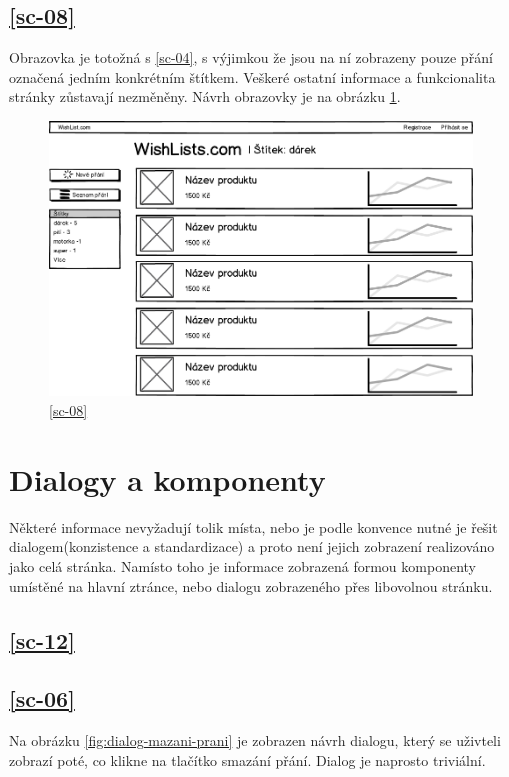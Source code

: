 \subsection{\ref{sc-08}}
\label{sec:prani-podle-stitku}
Obrazovka je totožná s \ref{sc-04}, s výjimkou že jsou na ní zobrazeny pouze přání označená jedním konkrétním štítkem. Veškeré ostatní informace a funkcionalita stránky zůstavají nezměněny. Návrh obrazovky je na obrázku \ref{fig:prani-oznacena-tagem}.

\begin{figure}[htb]
\begin{center}
\includegraphics[width=130mm]{./pictures/mock/prani-oznacena-tagem.png}
\caption{\ref{sc-08}}
\label{fig:prani-oznacena-tagem}
\end{center}
\end{figure}

\section{Dialogy a komponenty}
Některé informace nevyžadují tolik místa, nebo je podle konvence nutné je řešit dialogem(konzistence a standardizace\cite{molich1990improving}) a proto není jejich zobrazení realizováno jako celá stránka. Namísto toho je informace zobrazená formou komponenty umístěné na hlavní ztránce, nebo dialogu zobrazeného přes libovolnou stránku.

\subsection{\ref{sc-12}}

\subsection{\ref{sc-06}}
Na obrázku \ref{fig:dialog-mazani-prani} je zobrazen návrh dialogu, který se uživteli zobrazí poté, co klikne na tlačítko smazání přání. Dialog je naprosto triviální.

